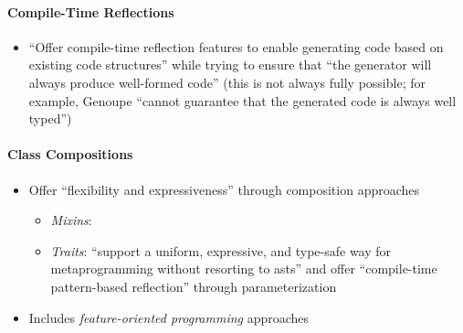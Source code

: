 \paragraph{Compile-Time Reflections \citep[p.~113:15-16]{lilis_survey_2019}}
\begin{itemize}
      \item ``Offer compile-time reflection features to enable generating code
            based on existing code structures'' while trying to ensure that ``the
            generator will always produce well-formed code'' (this is not always
            fully possible; for example, Genoupe ``cannot guarantee that the
            generated code is always well typed'')
            \citep[p.~113:15]{lilis_survey_2019}
\end{itemize}

\paragraph{Class Compositions \citep[p.~113:16-17]{lilis_survey_2019}}
\begin{itemize}
      \item Offer ``flexibility and expressiveness'' through composition
            approaches \citep[p.~113:16]{lilis_survey_2019}
            \begin{itemize}
                  \item \emph{Mixins}: 
                  \item \emph{Traits}: ``support a uniform, expressive, and
                        type-safe way for metaprogramming without resorting to
                        \acsp{ast}'' and offer ``compile-time pattern-based
                        reflection'' through parameterization
                        \citep[p.~113:16]{lilis_survey_2019}
            \end{itemize}
      \item Includes \emph{feature-oriented programming} approaches
\end{itemize}


